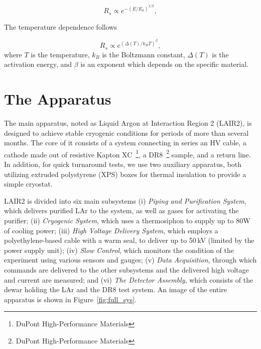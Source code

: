 \documentclass[a4paper,12pt]{article}
\newcommand{\DR}{DR8}
\begin{document}
\begin{equation}
    \label{eq:efield}
    {R_s} \propto e^{- (E / E_0)^{1/2}},
\end{equation}

The temperature dependence follows

\begin{equation}
\label{eq:Tdep}
    R_s \propto  e^{( \Delta(T) / k_B T)^{\beta}},
\end{equation}
where $T$ is the temperature, $k_B$ is the Boltzmann constant, $\Delta(T)$ is the activation energy, and $\beta$ is an exponent which depends on the specific material.



\section{The Apparatus}
\label{sec:expsetup}
The main apparatus, noted as Liquid Argon at Interaction Region 2 (LAIR2), is designed to achieve stable cryogenic conditions for periods of more than several months. The core of it consists of a system connecting in series an HV cable, a cathode made out of resistive Kapton XC~\footnote{DuPont High-Performance Materials}, a {\DR}~\footnote{DuPont High-Performance Materials} sample, and a return line. In addition, for quick turnaround tests, we use two auxiliary apparatus, both utilizing extruded polystyrene (XPS) boxes for thermal insulation to provide a simple cryostat. 

LAIR2 is divided into six main subsystems (i) \emph{Piping and Purification System}, which delivers purified LAr to the system, as well as gases for activating the purifier; (ii) \emph{Cryogenic System}, which uses a thermosiphon to supply up to 80W of cooling power; (iii) \emph{High Voltage Delivery System}, which employs a polyethylene-based cable with a warm seal, to deliver up to 50\,kV (limited by the power supply unit); (iv) \emph{Slow Control}, which monitors the condition of the experiment using various sensors and gauges; (v) \emph{Data Acquisition}, through which commands are delivered to the other subsystems and the delivered high voltage and current are measured; and (vi) \emph{The Detector Assembly}, which consists of the dewar holding the LAr and the {\DR} test system. An image of the entire apparatus is shown in Figure~\ref{fig:full_sys}.
\end{document}
